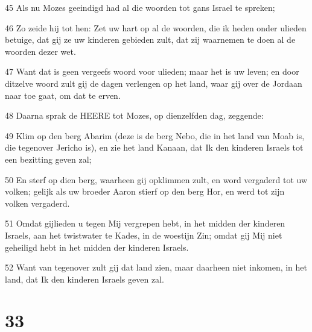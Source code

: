\par 45 Als nu Mozes geeindigd had al die woorden tot gans Israel te spreken;
\par 46 Zo zeide hij tot hen: Zet uw hart op al de woorden, die ik heden onder ulieden betuige, dat gij ze uw kinderen gebieden zult, dat zij waarnemen te doen al de woorden dezer wet.
\par 47 Want dat is geen vergeefs woord voor ulieden; maar het is uw leven; en door ditzelve woord zult gij de dagen verlengen op het land, waar gij over de Jordaan naar toe gaat, om dat te erven.
\par 48 Daarna sprak de HEERE tot Mozes, op dienzelfden dag, zeggende:
\par 49 Klim op den berg Abarim (deze is de berg Nebo, die in het land van Moab is, die tegenover Jericho is), en zie het land Kanaan, dat Ik den kinderen Israels tot een bezitting geven zal;
\par 50 En sterf op dien berg, waarheen gij opklimmen zult, en word vergaderd tot uw volken; gelijk als uw broeder Aaron stierf op den berg Hor, en werd tot zijn volken vergaderd.
\par 51 Omdat gijlieden u tegen Mij vergrepen hebt, in het midden der kinderen Israels, aan het twistwater te Kades, in de woestijn Zin; omdat gij Mij niet geheiligd hebt in het midden der kinderen Israels.
\par 52 Want van tegenover zult gij dat land zien, maar daarheen niet inkomen, in het land, dat Ik den kinderen Israels geven zal.

\chapter{33}

